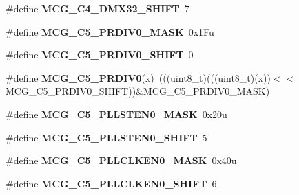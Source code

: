 \begin{DoxyCompactItemize}
\item 
\#define {\bfseries M\+C\+G\+\_\+\+C4\+\_\+\+D\+M\+X32\+\_\+\+S\+H\+I\+FT}~7\hypertarget{group__MCG__Register__Masks_ga12d73b2d4a4fd1f2fb21a1cbe87aaa83}{}\label{group__MCG__Register__Masks_ga12d73b2d4a4fd1f2fb21a1cbe87aaa83}

\item 
\#define {\bfseries M\+C\+G\+\_\+\+C5\+\_\+\+P\+R\+D\+I\+V0\+\_\+\+M\+A\+SK}~0x1\+Fu\hypertarget{group__MCG__Register__Masks_ga28ab0b9007f9941707395660db088172}{}\label{group__MCG__Register__Masks_ga28ab0b9007f9941707395660db088172}

\item 
\#define {\bfseries M\+C\+G\+\_\+\+C5\+\_\+\+P\+R\+D\+I\+V0\+\_\+\+S\+H\+I\+FT}~0\hypertarget{group__MCG__Register__Masks_ga452026beec3bec5a580d151e15d83f30}{}\label{group__MCG__Register__Masks_ga452026beec3bec5a580d151e15d83f30}

\item 
\#define {\bfseries M\+C\+G\+\_\+\+C5\+\_\+\+P\+R\+D\+I\+V0}(x)~(((uint8\+\_\+t)(((uint8\+\_\+t)(x))$<$$<$M\+C\+G\+\_\+\+C5\+\_\+\+P\+R\+D\+I\+V0\+\_\+\+S\+H\+I\+FT))\&M\+C\+G\+\_\+\+C5\+\_\+\+P\+R\+D\+I\+V0\+\_\+\+M\+A\+SK)\hypertarget{group__MCG__Register__Masks_gaff29a787086eaba9ef46f4e873d83a54}{}\label{group__MCG__Register__Masks_gaff29a787086eaba9ef46f4e873d83a54}

\item 
\#define {\bfseries M\+C\+G\+\_\+\+C5\+\_\+\+P\+L\+L\+S\+T\+E\+N0\+\_\+\+M\+A\+SK}~0x20u\hypertarget{group__MCG__Register__Masks_ga9bec4ed23caf6a431b506e944d928080}{}\label{group__MCG__Register__Masks_ga9bec4ed23caf6a431b506e944d928080}

\item 
\#define {\bfseries M\+C\+G\+\_\+\+C5\+\_\+\+P\+L\+L\+S\+T\+E\+N0\+\_\+\+S\+H\+I\+FT}~5\hypertarget{group__MCG__Register__Masks_ga486796db598fbf2f07f39d71453f49b6}{}\label{group__MCG__Register__Masks_ga486796db598fbf2f07f39d71453f49b6}

\item 
\#define {\bfseries M\+C\+G\+\_\+\+C5\+\_\+\+P\+L\+L\+C\+L\+K\+E\+N0\+\_\+\+M\+A\+SK}~0x40u\hypertarget{group__MCG__Register__Masks_ga73671453b8f8804784e5b7e67551726d}{}\label{group__MCG__Register__Masks_ga73671453b8f8804784e5b7e67551726d}

\item 
\#define {\bfseries M\+C\+G\+\_\+\+C5\+\_\+\+P\+L\+L\+C\+L\+K\+E\+N0\+\_\+\+S\+H\+I\+FT}~6\hypertarget{group__MCG__Register__Masks_gaa66ceed70e1055a31e46c60a502b8eb7}{}\label{group__MCG__Register__Masks_gaa66ceed70e1055a31e46c60a502b8eb7}


\end{DoxyCompactItemize}
